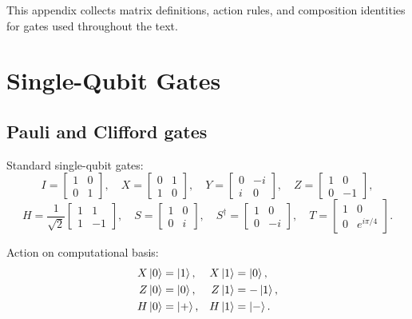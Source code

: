 This appendix collects matrix definitions, action rules, and composition identities for gates used throughout the text.

\section{Single-Qubit Gates}

\subsection{Pauli and Clifford gates}

Standard single-qubit gates:
\begin{equation}
I=\begin{bmatrix}1&0\\0&1\end{bmatrix},\quad
X=\begin{bmatrix}0&1\\1&0\end{bmatrix},\quad
Y=\begin{bmatrix}0&-i\\i&0\end{bmatrix},\quad
Z=\begin{bmatrix}1&0\\0&-1\end{bmatrix},
\end{equation}
\begin{equation}
H=\frac{1}{\sqrt2}\begin{bmatrix}1&1\\1&-1\end{bmatrix},\quad
S=\begin{bmatrix}1&0\\0&i\end{bmatrix},\quad
S^\dagger=\begin{bmatrix}1&0\\0&-i\end{bmatrix},\quad
T=\begin{bmatrix}1&0\\0&e^{i\pi/4}\end{bmatrix}.
\end{equation}

Action on computational basis:
\begin{align*}
X\ket{0}&=\ket{1}, & X\ket{1}&=\ket{0}, \\
Z\ket{0}&=\ket{0}, & Z\ket{1}&=-\ket{1}, \\
H\ket{0}&=\ket{+}, & H\ket{1}&=\ket{-}.
\end{align*}

